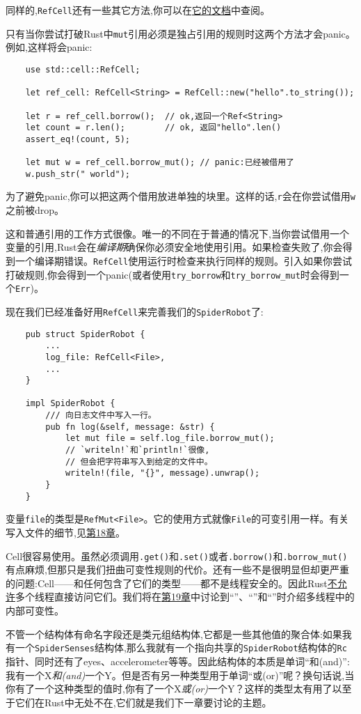 同样的,\texttt{RefCell}还有一些其它方法,你可以在\href{https://doc.rust-lang.org/std/cell/struct.RefCell.html}{它的文档}中查阅。

只有当你尝试打破Rust中\texttt{mut}引用必须是独占引用的规则时这两个方法才会panic。例如,这样将会panic:
\begin{verbatim}
    use std::cell::RefCell;

    let ref_cell: RefCell<String> = RefCell::new("hello".to_string());

    let r = ref_cell.borrow();  // ok,返回一个Ref<String>
    let count = r.len();        // ok, 返回"hello".len()
    assert_eq!(count, 5);       

    let mut w = ref_cell.borrow_mut(); // panic:已经被借用了
    w.push_str(" world");
\end{verbatim}

为了避免panic,你可以把这两个借用放进单独的块里。这样的话,\texttt{r}会在你尝试借用\texttt{w}之前被drop。

这和普通引用的工作方式很像。唯一的不同在于普通的情况下,当你尝试借用一个变量的引用,Rust会在\emph{编译期}确保你必须安全地使用引用。如果检查失败了,你会得到一个编译期错误。\texttt{RefCell}使用运行时检查来执行同样的规则。引入如果你尝试打破规则,你会得到一个panic(或者使用\texttt{try\_borrow}和\texttt{try\_borrow\_mut}时会得到一个\texttt{Err})。

现在我们已经准备好用\texttt{RefCell}来完善我们的\texttt{SpiderRobot}了:
\begin{verbatim}
    pub struct SpiderRobot {
        ...
        log_file: RefCell<File>,
        ...
    }

    impl SpiderRobot {
        /// 向日志文件中写入一行。
        pub fn log(&self, message: &str) {
            let mut file = self.log_file.borrow_mut();
            // `writeln!`和`println!`很像,
            // 但会把字符串写入到给定的文件中。
            writeln!(file, "{}", message).unwrap();
        }
    }
\end{verbatim}

变量\texttt{file}的类型是\texttt{RefMut<File>}。它的使用方式就像\texttt{File}的可变引用一样。有关写入文件的细节,见\hyperref[ch18]{第18章}。

Cell很容易使用。虽然必须调用\texttt{.get()}和\texttt{.set()}或者\texttt{.borrow()}和\texttt{.borrow\_mut()}有点麻烦,但那只是我们扭曲可变性规则的代价。还有一些不是很明显但却更严重的问题:Cell——和任何包含了它们的类型——都不是线程安全的。因此Rust\hyperref[threadsafe]{不允许}多个线程直接访问它们。我们将在\hyperref[ch19]{第19章}中讨论到“”、“”和“”时介绍多线程中的内部可变性。

不管一个结构体有命名字段还是类元组结构体,它都是一些其他值的聚合体:如果我有一个\texttt{SpiderSenses}结构体,那么我就有一个指向共享的\texttt{SpiderRobot}结构体的\texttt{Rc}指针、同时还有了eyes、accelerometer等等。因此结构体的本质是单词“和(and)”:我有一个X\emph{和(and)}一个Y。但是否有另一种类型用于单词“或(or)”呢？换句话说,当你有了一个这种类型的值时,你有了一个X\emph{或(or)}一个Y？这样的类型太有用了以至于它们在Rust中无处不在,它们就是我们下一章要讨论的主题。
